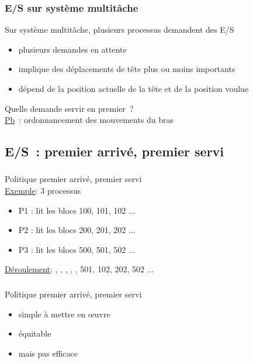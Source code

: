 \begin{frame}
  \frametitle{E/S sur système multitâche}
  Sur système multitâche, plusieurs processus demandent des E/S
  \begin{itemize}
  \item plusieurs demandes en attente
  \item implique des déplacements de tête plus ou moins importants 
  \item dépend de la position actuelle de la tête et de la position voulue  
  \end{itemize}
  \vspace{0.5cm}
  Quelle demande servir en premier~?\\
\underline{Pb}~: \alert{ordonnancement} des mouvements du bras
\end{frame}

\subsection{E/S~: premier arrivé, premier servi}
\begin{frame}
  \frametitle{\insertsubsection}
  Politique premier arrivé, premier servi\\
  \vspace{0.5cm}
  \underline{Exemple}: 3 processus
  \begin{itemize}
  \item P1 : lit les blocs 100, 101, 102 ...
  \item P2 : lit les blocs 200, 201, 202 ...
  \item P3 : lit les blocs 500, 501, 502 ...
  \end{itemize}
  \vspace{0.5cm}
  \pause
  \underline{Déroulement}:
  , 
  , 
  , 
  , 
  , 
  501, 102, 202, 502 ...
\end{frame}

\begin{frame}
  \frametitle{\insertsubsection}
  \large
  Politique premier arrivé, premier servi 
  \begin{itemize}
  \item \alert{simple} à mettre en \oe{}uvre
  \item \alert{équitable}
  \item mais \alert{pas efficace}
  \end{itemize}
  \normalsize
\end{frame}


